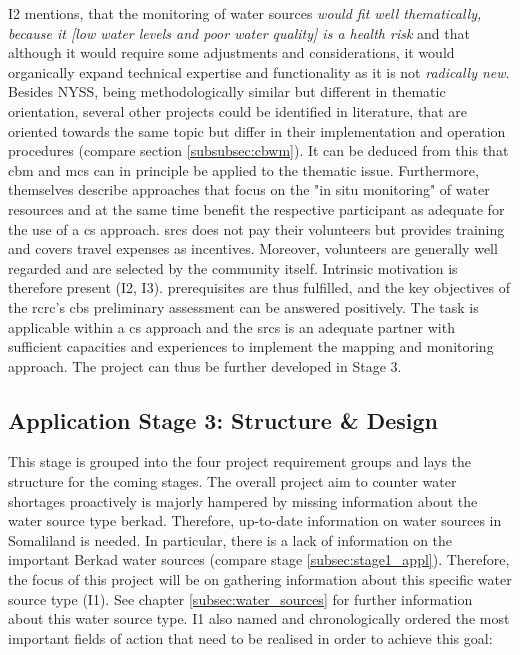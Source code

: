 I2 mentions, that the monitoring of water sources \textit{would fit well thematically, because it [low water levels and poor water quality] is a health risk} and that although it would require some adjustments and considerations, it would organically expand technical expertise and functionality as it is not \textit{radically new}. Besides NYSS, being methodologically similar but different in thematic orientation, several other projects could be identified in literature, that are oriented towards the same topic but differ in their implementation and operation procedures (compare section \ref*{subsubsec:cbwm}). It can be deduced from this that \acrshort{cbm} and \acrshort{mcs} can in principle be applied to the thematic issue. Furthermore, \autocite{fraislCitizenScienceEnvironmental2022} themselves describe approaches that focus on the "in situ monitoring" of water resources and at the same time benefit the respective participant as adequate for the use of a \acrlong{cs} approach. \acrshort{srcs} does not pay their volunteers but provides training and covers travel expenses as incentives. Moreover, volunteers are generally well regarded and are selected by the community itself. Intrinsic motivation is therefore present (I2, I3).\newline
\autocite{fraislCitizenScienceEnvironmental2022} prerequisites are thus fulfilled, and the key objectives of the \acrshort{rcrc}'s \acrshort{cbs} preliminary assessment can be answered positively. The task is applicable within a \acrshort{cs} approach and the \acrshort{srcs} is an adequate partner with sufficient capacities and experiences to implement the mapping and monitoring approach. The project can thus be further developed in Stage 3.

\subsection{Application Stage 3: Structure \& Design}\label{subsec:stage3_appl}

This stage is grouped into the four project requirement groups and lays the structure for the coming stages. The overall project aim to counter water shortages proactively is majorly hampered by missing information about the water source type berkad. Therefore, up-to-date information on water sources in Somaliland is needed. In particular, there is a lack of information on the important Berkad water sources (compare stage \ref*{subsec:stage1_appl}). Therefore, the focus of this project will be on gathering information about this specific water source type (I1). See chapter \ref*{subsec:water_sources} for further information about this water source type. I1 also named and chronologically ordered the most important fields of action that need to be realised in order to achieve this goal:

